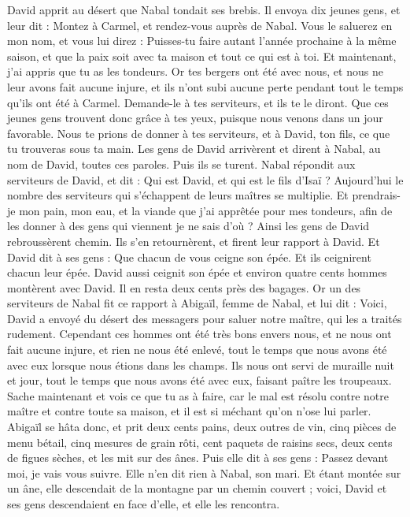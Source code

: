 \begin{multicols}{2}
David apprit au désert que Nabal tondait ses brebis.
Il envoya dix jeunes gens, et leur dit : Montez à Carmel, et rendez-vous auprès de Nabal. Vous le saluerez en mon nom,
et vous lui direz : Puisses-tu faire autant l'année prochaine à la même saison, et que la paix soit avec ta maison et tout ce qui est à toi.
Et maintenant, j'ai appris que tu as les tondeurs. Or tes bergers ont été avec nous, et nous ne leur avons fait aucune injure, et ils n'ont subi aucune perte pendant tout le temps qu'ils ont été à Carmel.
Demande-le à tes serviteurs, et ils te le diront. Que ces jeunes gens trouvent donc grâce à tes yeux, puisque nous venons dans un jour favorable. Nous te prions de donner à tes serviteurs, et à David, ton fils, ce que tu trouveras sous ta main.
Les gens de David arrivèrent et dirent à Nabal, au nom de David, toutes ces paroles. Puis ils se turent.
Nabal répondit aux serviteurs de David, et dit : Qui est David, et qui est le fils d'Isaï ? Aujourd'hui le nombre des serviteurs qui s'échappent de leurs maîtres se multiplie.
Et prendrais-je mon pain, mon eau, et la viande que j'ai apprêtée pour mes tondeurs, afin de les donner à des gens qui viennent je ne sais d'où ?
Ainsi les gens de David rebroussèrent chemin. Ils s'en retournèrent, et firent leur rapport à David.
Et David dit à ses gens : Que chacun de vous ceigne son épée. Et ils ceignirent chacun leur épée. David aussi ceignit son épée et environ quatre cents hommes montèrent avec David. Il en resta deux cents près des bagages.
Or un des serviteurs de Nabal fit ce rapport à Abigaïl, femme de Nabal, et lui dit : Voici, David a envoyé du désert des messagers pour saluer notre maître, qui les a traités rudement.
Cependant ces hommes ont été très bons envers nous, et ne nous ont fait aucune injure, et rien ne nous été enlevé, tout le temps que nous avons été avec eux lorsque nous étions dans les champs.
Ils nous ont servi de muraille nuit et jour, tout le temps que nous avons été avec eux, faisant paître les troupeaux.
Sache maintenant et vois ce que tu as à faire, car le mal est résolu contre notre maître et contre toute sa maison, et il est si méchant qu'on n'ose lui parler.
Abigaïl se hâta donc, et prit deux cents pains, deux outres de vin, cinq pièces de menu bétail, cinq mesures de grain rôti, cent paquets de raisins secs, deux cents de figues sèches, et les mit sur des ânes.
Puis elle dit à ses gens : Passez devant moi, je vais vous suivre. Elle n'en dit rien à Nabal, son mari.
Et étant montée sur un âne, elle descendait de la montagne par un chemin couvert ; voici, David et ses gens descendaient en face d'elle, et elle les rencontra.

\end{multicols}
